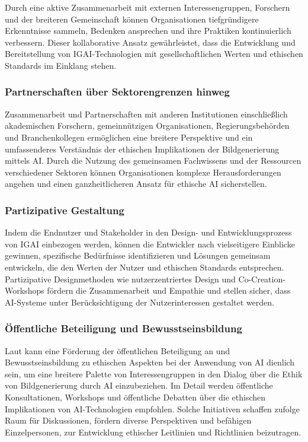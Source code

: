 \documentclass[12pt]{report}
\begin{document}
Durch eine aktive Zusammenarbeit mit externen Interessengruppen, Forschern und der breiteren Gemeinschaft können Organisationen tiefgründigere Erkenntnisse sammeln, Bedenken ansprechen und ihre Praktiken kontinuierlich verbessern. Dieser kollaborative Ansatz gewährleistet, dass die Entwicklung und Bereitstellung von IGAI-Technologien mit gesellschaftlichen Werten und ethischen Standards im Einklang stehen.\cite{EUCommision}\cite{UNESCO}

\subsubsection{Partnerschaften über Sektorengrenzen hinweg}
Zusammenarbeit und Partnerschaften mit anderen Institutionen einschließlich akademischen Forschern, gemeinnützigen Organisationen, Regierungsbehörden und Branchenkollegen ermöglichen eine breitere Perspektive und ein umfassenderes Verständnis der ethischen Implikationen der Bildgenerierung mittels AI. Durch die Nutzung des gemeinsamen Fachwissens und der Ressourcen verschiedener Sektoren können Organisationen komplexe Herausforderungen angehen und einen ganzheitlicheren Ansatz für ethische AI sicherstellen.\cite{Vogel}

\subsubsection{Partizipative Gestaltung}
Indem die Endnutzer und Stakeholder in den Design- und Entwicklungsprozess von IGAI einbezogen werden, können die Entwickler nach \cite{Zytko} vielseitigere Einblicke gewinnen, spezifische Bedürfnisse identifizieren und Lösungen gemeinsam entwickeln, die den Werten der Nutzer und ethischen Standards entsprechen. Partizipative Designmethoden wie nutzerzentriertes Design und Co-Creation-Workshops fördern die Zusammenarbeit und Empathie und stellen sicher, dass AI-Systeme unter Berücksichtigung der Nutzerinteressen gestaltet werden.

\subsubsection{Öffentliche Beteiligung und Bewusstseinsbildung}
Laut \cite{WILSON2022101652} kann eine Förderung der öffentlichen Beteiligung an und Bewusstseinsbildung zu ethischen Aspekten bei der Anwendung von AI dienlich sein, um eine breitere Palette von Interessengruppen in den Dialog über die Ethik von Bildgenerierung durch AI einzubeziehen. Im Detail werden öffentliche Konsultationen, Workshops und öffentliche Debatten über die ethischen Implikationen von AI-Technologien empfohlen. Solche Initiativen schaffen \cite{WILSON2022101652} zufolge Raum für Diskussionen, fördern diverse Perspektiven und befähigen Einzelpersonen, zur Entwicklung ethischer Leitlinien und Richtlinien beizutragen.
\end{document}

